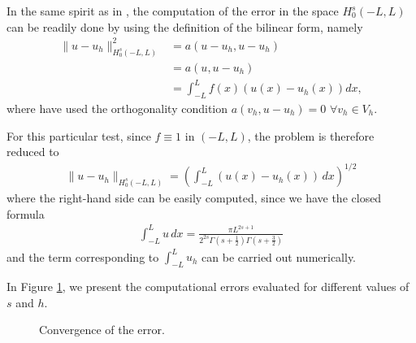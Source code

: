 In the same spirit as in \cite{acosta2017short}, the computation of the error in the space $H_0^s(-L,L)$ can be readily done by using the definition of the bilinear form, namely
%
\begin{align*}
\|u-u_h\|^2_{H_0^s(-L,L)}&=a(u-u_h,u-u_h) \\
&=a(u,u-u_h) \\
&=\int_{-L}^{L}f(x)\left(u(x)-u_h(x)\right)dx,
\end{align*}
%
where have used the orthogonality condition $a(v_h,u-u_h)=0$ $\forall v_h \in V_h$.

For this particular test, since $f\equiv 1$ in $(-L,L)$, the problem is therefore reduced to
%
\begin{align*}
\|u-u_h\|_{H^s_0(-L,L)}=\left(\int_{-L}^{L}\left( u(x)-u_h(x) \right)\,dx\right)^{1/2}
\end{align*}
%
where the right-hand side can be easily computed, since we have the closed formula 
%
\begin{align}
\int_{-L}^{L}u\,dx= \frac{\pi L^{2s+1}}{2^{2s}\Gamma(s+\frac{1}{2})\Gamma(s+\frac{3}{2})}
\end{align}
% 
and the term corresponding to $\int_{-L}^{L}u_h$ can be carried out numerically. 

In Figure \ref{error}, we present the computational errors evaluated for different values of $s$ and $h$. 

\begin{figure}[!h]
 \centering
%
\caption{Convergence of the error.}
\label{error}
\end{figure}

